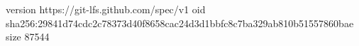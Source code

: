 version https://git-lfs.github.com/spec/v1
oid sha256:29841d74cdc2c78373d40f8658cac24d3d1bbfc8c7ba329ab810b51557860bae
size 87544
